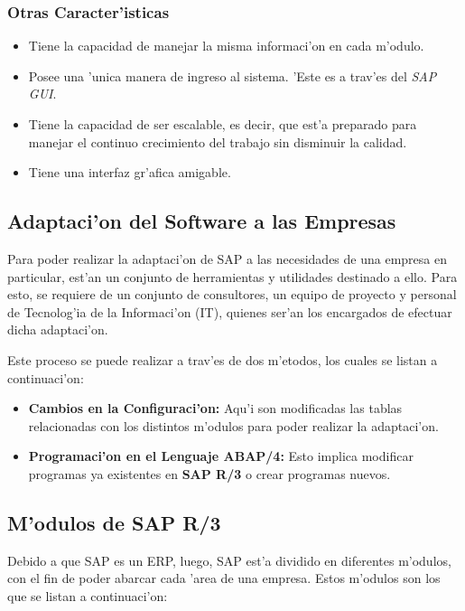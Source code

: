 \subsubsection{Otras Caracter'isticas}
\begin{itemize}
\item Tiene la capacidad de manejar la misma informaci'on en cada m'odulo.
\item Posee una 'unica manera de ingreso al sistema. 'Este es a trav'es del \textit{SAP GUI}.
\item Tiene la capacidad de ser escalable, es decir, que est'a preparado para manejar el continuo crecimiento del trabajo sin disminuir la calidad.
\item Tiene una interfaz gr'afica amigable.
\end{itemize}

\subsection{Adaptaci'on del Software a las Empresas}
Para poder realizar la adaptaci'on de SAP a las necesidades de una empresa en particular, est'an un conjunto de herramientas y utilidades destinado a ello. Para esto, se requiere de un conjunto de consultores, un equipo de proyecto y personal de Tecnolog'ia de la Informaci'on (IT), quienes ser'an los encargados de efectuar dicha adaptaci'on. 

Este proceso se puede realizar a trav'es de dos m'etodos, los cuales se listan a continuaci'on:

\begin{itemize}
\item \textbf{Cambios en la Configuraci'on:} Aqu'i son modificadas las tablas relacionadas con los distintos m'odulos para poder realizar la adaptaci'on.
\item \textbf{Programaci'on en el Lenguaje ABAP/4:} Esto implica modificar programas ya existentes en \textbf{SAP R/3} o crear programas nuevos.
\end{itemize}

\subsection{M'odulos de SAP R/3}
Debido a que SAP es un ERP, luego, SAP est'a dividido en diferentes m'odulos, con el fin de poder abarcar cada 'area de una empresa. Estos m'odulos son los que se listan a continuaci'on:

